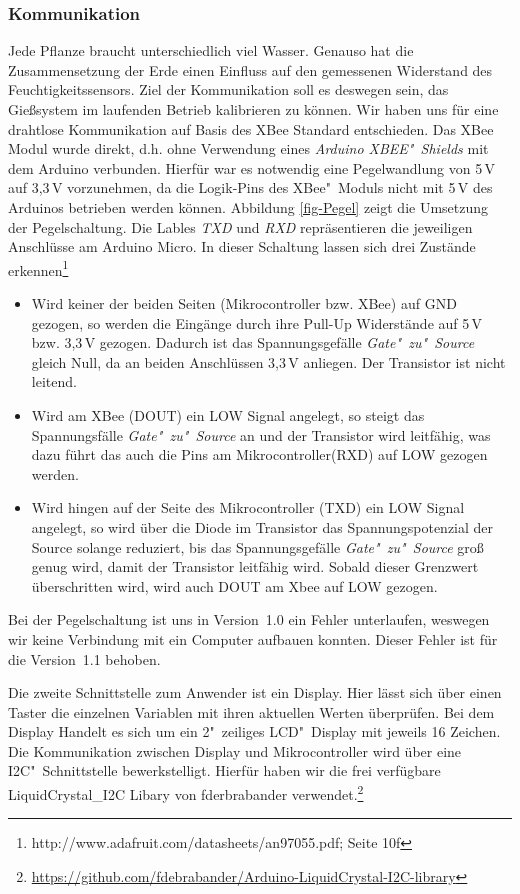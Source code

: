 \subsubsection{Kommunikation}
Jede Pflanze braucht unterschiedlich viel Wasser. 
Genauso hat die Zusammensetzung der Erde einen Einfluss auf den gemessenen Widerstand des Feuchtigkeitssensors.
Ziel der Kommunikation soll es deswegen sein, das Gießsystem im laufenden Betrieb kalibrieren zu können. 
Wir haben uns für eine drahtlose Kommunikation auf Basis des XBee Standard entschieden. 
Das XBee Modul wurde direkt, d.h. ohne Verwendung eines \emph{Arduino XBEE"~Shields} mit dem Arduino verbunden. 
Hierfür war es notwendig eine Pegelwandlung von 5\,V auf 3,3\,V vorzunehmen, da die Logik-Pins des XBee"~Moduls nicht mit 5\,V des Arduinos betrieben werden können. 
Abbildung \ref{fig-Pegel} zeigt die Umsetzung der Pegelschaltung. Die Lables \emph{TXD} und \emph{RXD} repräsentieren die jeweiligen Anschlüsse am Arduino Micro. In dieser Schaltung lassen sich drei Zustände erkennen\footnote{http://www.adafruit.com/datasheets/an97055.pdf; Seite 10f}
\begin{itemize}
\item Wird keiner der beiden Seiten (Mikrocontroller bzw. XBee) auf GND gezogen, so werden die Eingänge durch ihre Pull-Up 	Widerstände auf 5\,V bzw. 3,3\,V gezogen.
Dadurch ist das Spannungsgefälle \emph{Gate"~zu"~Source} gleich Null, da an beiden Anschlüssen 3,3\,V anliegen. Der Transistor ist nicht leitend.
\item Wird am XBee (DOUT) ein LOW Signal angelegt, so steigt das Spannungsfälle \emph{Gate"~zu"~Source} an und der Transistor wird leitfähig, was dazu führt das auch die Pins am Mikrocontroller(RXD) auf LOW gezogen werden.
\item Wird hingen auf der Seite des Mikrocontroller (TXD) ein LOW Signal angelegt, so wird über die Diode im Transistor das Spannungspotenzial der Source solange reduziert, bis das Spannungsgefälle \emph{Gate"~zu"~Source} groß genug wird, damit der Transistor leitfähig wird. Sobald dieser Grenzwert überschritten wird, wird auch DOUT am Xbee auf LOW gezogen.
\end{itemize}

Bei der Pegelschaltung ist uns in Version~1.0 ein Fehler unterlaufen, weswegen wir keine Verbindung mit ein Computer aufbauen konnten. Dieser Fehler ist für die Version~1.1 behoben.





		
Die zweite Schnittstelle zum Anwender ist ein Display. 
Hier lässt sich über einen Taster die einzelnen Variablen mit ihren aktuellen Werten überprüfen. 
Bei dem Display Handelt es sich um ein 2"~zeiliges LCD"~Display mit jeweils 16 Zeichen. 
Die Kommunikation zwischen Display und Mikrocontroller wird über eine I2C"~Schnittstelle bewerkstelligt. 
Hierfür haben wir die frei verfügbare \mbox{LiquidCrystal\_I2C} Libary von fderbrabander verwendet.\footnote{\href{https://github.com/fdebrabander/Arduino-LiquidCrystal-I2C-library}{https://github.com/fdebrabander/Arduino-LiquidCrystal-I2C-library}}


